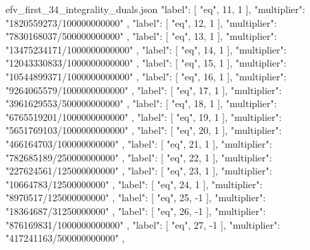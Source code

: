 \documentclass[12pt,a4paper]{article}
\numberwithin{equation}{section}
\theoremstyle{definition}
\begin{document}
\begin{filecontents*}[overwrite]{efv_first_34_integrality_duals.json}
        {
          "label": [
            "eq",
            11,
            1
          ],
          "multiplier": "1820559273/100000000000"
        },
        {
          "label": [
            "eq",
            12,
            1
          ],
          "multiplier": "7830168037/500000000000"
        },
        {
          "label": [
            "eq",
            13,
            1
          ],
          "multiplier": "13475234171/1000000000000"
        },
        {
          "label": [
            "eq",
            14,
            1
          ],
          "multiplier": "12043330833/1000000000000"
        },
        {
          "label": [
            "eq",
            15,
            1
          ],
          "multiplier": "10544899371/1000000000000"
        },
        {
          "label": [
            "eq",
            16,
            1
          ],
          "multiplier": "9264065579/1000000000000"
        },
        {
          "label": [
            "eq",
            17,
            1
          ],
          "multiplier": "3961629553/500000000000"
        },
        {
          "label": [
            "eq",
            18,
            1
          ],
          "multiplier": "6765519201/1000000000000"
        },
        {
          "label": [
            "eq",
            19,
            1
          ],
          "multiplier": "5651769103/1000000000000"
        },
        {
          "label": [
            "eq",
            20,
            1
          ],
          "multiplier": "466164703/100000000000"
        },
        {
          "label": [
            "eq",
            21,
            1
          ],
          "multiplier": "782685189/250000000000"
        },
        {
          "label": [
            "eq",
            22,
            1
          ],
          "multiplier": "227624561/125000000000"
        },
        {
          "label": [
            "eq",
            23,
            1
          ],
          "multiplier": "10664783/12500000000"
        },
        {
          "label": [
            "eq",
            24,
            1
          ],
          "multiplier": "8970517/125000000000"
        },
        {
          "label": [
            "eq",
            25,
            -1
          ],
          "multiplier": "18364687/31250000000"
        },
        {
          "label": [
            "eq",
            26,
            -1
          ],
          "multiplier": "876169831/1000000000000"
        },
        {
          "label": [
            "eq",
            27,
            -1
          ],
          "multiplier": "417241163/500000000000"
        },

\end{filecontents*}
\end{document}

